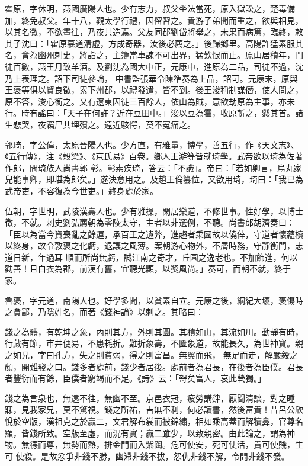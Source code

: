 \begin{pinyinscope}
 霍原，字休明，燕國廣陽人也。少有志力，叔父坐法當死，原入獄訟之，楚毒備加，終免叔父。年十八，觀太學行禮，因留習之。貴游子弟聞而重之，欲與相見，以其名微，不欲晝往，乃夜共造焉。父友同郡劉岱將舉之，未果而病篤，臨終，敕其子沈曰：「霍原慕道清虛，方成奇器，汝後必薦之。」後歸鄉里。高陽許猛素服其名，會為幽州刺史，將詣之，主簿當車諫不可出界，猛歎恨而止。原山居積年，門徒百數，燕王月致羊酒。及劉沈為國大中正，元康中，進原為二品，司徒不過，沈乃上表理之。詔下司徒參論，
 中書監張華令陳準奏為上品，詔可。元康末，原與王褒等俱以賢良徵，累下州郡，以禮發遣，皆不到。後王浚稱制謀僭，使人問之，原不答，浚心銜之。又有遼東囚徒三百餘人，依山為賊，意欲劫原為主事，亦未行。時有謠曰：「天子在何許？近在豆田中。」浚以豆為霍，收原斬之，懸其首。諸生悲哭，夜竊尸共埋殯之。遠近駭愕，莫不冤痛之。



 郭琦，字公偉，太原晉陽人也。少方直，有雅量，博學，善五行，作《天文志》、《五行傳》，注《穀梁》、《京氏易》百卷。鄉人王游等皆就琦學。武帝欲以琦為佐著作郎，問琦族人尚書郭
 彰。彰素疾琦，答云：「不識」。帝曰：「若如卿言，烏丸家兒能事卿，即堪為郎矣。」遂決意用之。及趙王倫篡位，又欲用琦，琦曰：「我已為武帝吏，不容復為今世吏。」終身處於家。



 伍朝，字世明，武陵漢壽人也。少有雅操，閑居樂道，不修世事。性好學，以博士徵，不就。刺史劉弘薦朝為零陵太守，主者以非選例，不聽。尚書郎胡濟奏曰：「臣以為當今資喪亂之餘運，承百王之遺弊，進趨者乘國故以僥倖，守道者懷蘊櫝以終身，故令敦褒之化虧，退讓之風薄。案朝游心物外，不屑時務，守靜衡門，志道日新，年過耳
 順而所尚無虧，誠江南之奇才，丘園之逸老也。不加飾進，何以勸善！且白衣為郡，前漢有舊，宜聽光顯，以獎風尚。」奏可，而朝不就，終于家。



 魯褒，字元道，南陽人也。好學多聞，以貧素自立。元康之後，綱紀大壞，褒傷時之貪鄙，乃隱姓名，而著《錢神論》以刺之。其略曰：



 錢之為體，有乾坤之象，內則其方，外則其圓。其積如山，其流如川。動靜有時，行藏有節，市井便易，不患耗折。難折象壽，不匱象道，故能長久，為世神寶。親之如兄，字曰孔方，失之則貧弱，得之則富昌。無翼而飛，
 無足而走，解嚴毅之顏，開難發之口。錢多者處前，錢少者居後。處前者為君長，在後者為臣僕。君長者豐衍而有餘，臣僕者窮竭而不足。《詩》云：「哿矣富人，哀此煢獨。」



 錢之為言泉也，無遠不往，無幽不至。京邑衣冠，疲勞講肄，厭聞清談，對之睡寐，見我家兄，莫不驚視。錢之所祐，吉無不利，何必讀書，然後富貴！昔呂公欣悅於空版，漢祖克之於贏二，文君解布裳而被錦繡，相如乘高蓋而解犢鼻，官尊名顯，皆錢所致。空版至虛，而況有實；贏二雖少，以致親密。由此論之，謂為神物。無德而尊，無勢而熱，排金門而入紫闥。危可使安，死可使活，貴可使賤，生可
 使殺。是故忿爭非錢不勝，幽滯非錢不拔，怨仇非錢不解，令問非錢不發。




\end{pinyinscope}

